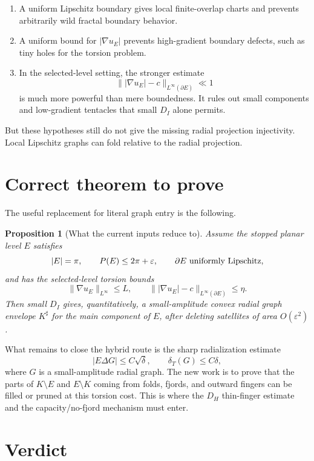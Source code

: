\documentclass[11pt]{article}
\newtheorem{proposition}[theorem]{Proposition}
\newcommand{\dT}{\delta_T}
\begin{document}
\begin{enumerate}[label=\arabic*.]
\item A uniform Lipschitz boundary gives local finite-overlap charts and
prevents arbitrarily wild fractal boundary behavior.
\item A uniform bound for \(|\nabla u_E|\) prevents high-gradient boundary
defects, such as tiny holes for the torsion problem.
\item In the selected-level setting, the stronger estimate
\[
   \bigl\||\nabla u_E|-c\bigr\|_{L^\infty(\partial E)}\ll1
\]
is much more powerful than mere boundedness.  It rules out small components
and low-gradient tentacles that small \(D_I\) alone permits.
\end{enumerate}

But these hypotheses still do not give the missing radial projection
injectivity.  Local Lipschitz graphs can fold relative to the radial
projection.

\section{Correct theorem to prove}

The useful replacement for literal graph entry is the following.

\begin{proposition}[What the current inputs reduce to]
Assume the stopped planar level \(E\) satisfies
\[
   |E|=\pi,\qquad
   P(E)\le2\pi+\varepsilon,\qquad
   \partial E\hbox{ uniformly Lipschitz},
\]
and has the selected-level torsion bounds
\[
   \|\nabla u_E\|_{L^\infty}\le L,\qquad
   \bigl\||\nabla u_E|-c\bigr\|_{L^\infty(\partial E)}\le\eta.
\]
Then small \(D_I\) gives, quantitatively, a small-amplitude convex radial
graph envelope \(K^\sharp\) for the main component of \(E\), after deleting
satellites of area \(O(\varepsilon^2)\).
\end{proposition}

What remains to close the hybrid route is the sharp radialization estimate
\[
   |E\Delta G|\le C\sqrt{\delta},
   \qquad
   \dT(G)\le C\delta,
\]
where \(G\) is a small-amplitude radial graph.  The new work is to prove that
the parts of \(K\setminus E\) and \(E\setminus K\) coming from folds, fjords,
and outward fingers can be filled or pruned at this torsion cost.  This is
where the \(D_H\) thin-finger estimate and the capacity/no-fjord mechanism
must enter.

\section{Verdict}
\end{document}
